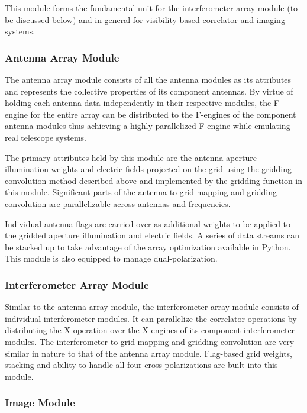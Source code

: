 \documentclass[a4paper,fleqn,usenatbib]{mnras}
\begin{document}
This module forms the fundamental unit for the interferometer array module 
(to be discussed below) and in general for visibility based correlator and 
imaging systems. 

\subsubsection{Antenna Array Module}

The antenna array module consists of all the antenna modules as its attributes
and represents the collective properties of its component antennas. By virtue of 
holding each antenna data independently in their respective modules, the F-engine 
for the entire array can be distributed to the F-engines of the component 
antenna modules thus achieving a highly parallelized F-engine while emulating 
real telescope systems.

The primary attributes held by this module are the antenna aperture 
illumination weights and electric fields projected on the grid using the 
gridding convolution method described above and implemented by the gridding 
function in this module. Significant parts of the antenna-to-grid mapping and 
gridding convolution are parallelizable across antennas and frequencies.

Individual antenna flags are carried over as additional weights to be applied
to the gridded aperture illumination and electric fields. A series of data 
streams can be stacked up to take advantage of the array optimization available 
in Python. This module is also equipped to manage dual-polarization. 

\subsubsection{Interferometer Array Module}

Similar to the antenna array module, the interferometer array module consists of
individual interferometer modules. It can parallelize the correlator operations
by distributing the X-operation over the X-engines of its component 
interferometer modules. The interferometer-to-grid mapping and gridding 
convolution are very similar in nature to that of the antenna array module. 
Flag-based grid weights, stacking and ability to handle all four 
cross-polarizations are built into this module. 

\subsubsection{Image Module}
\end{document}

